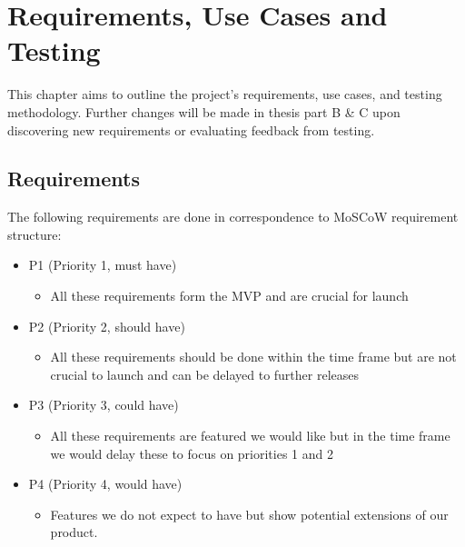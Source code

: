 \chapter{Requirements, Use Cases and Testing}\label{ch:style}

This chapter aims to outline the project's requirements, use cases, and testing methodology. Further changes will be made in thesis part B \& C upon discovering new requirements or evaluating feedback from testing. 

\section{Requirements}
The following requirements are done in correspondence to MoSCoW requirement structure:
\begin{itemize}
    \item P1 (Priority 1, must have)
    \begin{itemize}
        \item All these requirements form the MVP and are crucial for launch
    \end{itemize}
    \item P2 (Priority 2, should have)
    \begin{itemize}
        \item All these requirements should be done within the time frame but are not crucial to launch and can be delayed to further releases
    \end{itemize}    
    \item P3 (Priority 3, could have)
    \begin{itemize}
        \item All these requirements are featured we would like but in the time frame we would delay these to focus on priorities 1 and 2
    \end{itemize}
    \item P4 (Priority 4, would have)
    \begin{itemize}
        \item Features we do not expect to have but show potential extensions of our product.
    \end{itemize}     
\end{itemize}

